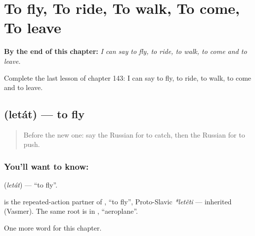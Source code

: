 
\chapter{To fly, To ride, To walk, To come, To leave}
\label{ch:ru-to-fly-to-ride-to-walk-to-come-to-leave}

\begin{chapteropening}
\textbf{By the end of this chapter:} \emph{I can say to fly, to ride, to walk, to come and to leave.}

Complete the last lesson of chapter 143: I can say to fly, to ride, to walk, to come and to leave.
\end{chapteropening}

\section[\texorpdfstring{\ru{летать} (letát)}{летать (letát)}]{ (letát) — to fly}

\label{lesson:RU-C143-letat}



\begin{quote}
Before the new one: say the Russian for to catch, then the Russian for to push.
\end{quote}

\subsection*{You'll want to know: }
\textbf{} (\emph{letát}) — \textquotedblleft{}to fly\textquotedblright{}.

\begin{cousinweb}
\textbf{} is the repeated-action partner of \emph{}, \textquotedblleft{}to fly\textquotedblright{}, Proto-Slavic \emph{*letěti} — inherited (Vasmer). The same root is in \emph{}, \textquotedblleft{}aeroplane\textquotedblright{}.
\end{cousinweb}

\begin{grammarlens}[title={What you've built}]
One more word for this chapter.
\end{grammarlens}

